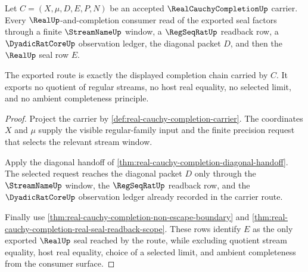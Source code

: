 \begin{theorem}
\label{thm:real-cauchy-completion-stream-regseq-tail-seal-factorization}
Let $C=(X,\mu,D,E,P,N)$ be an accepted $\RealCauchyCompletionUp$ carrier. Every $\RealUp$-and-completion consumer read of the exported seal factors through a finite $\StreamNameUp$ window, a $\RegSeqRatUp$ readback row, a $\DyadicRatCoreUp$ observation ledger, the diagonal packet $D$, and then the $\RealUp$ seal row $E$.

The exported route is exactly the displayed completion chain carried by $C$. It exports no quotient of regular streams, no host real equality, no selected limit, and no ambient completeness principle.
\end{theorem}
\begin{proof}
Project the carrier by \autoref{def:real-cauchy-completion-carrier}. The coordinates $X$ and $\mu$ supply the visible regular-family input and the finite precision request that selects the relevant stream window.

Apply the diagonal handoff of \autoref{thm:real-cauchy-completion-diagonal-handoff}. The selected request reaches the diagonal packet $D$ only through the $\StreamNameUp$ window, the $\RegSeqRatUp$ readback row, and the $\DyadicRatCoreUp$ observation ledger already recorded in the carrier route.

Finally use \autoref{thm:real-cauchy-completion-non-escape-boundary} and \autoref{thm:real-cauchy-completion-real-seal-readback-scope}. These rows identify $E$ as the only exported $\RealUp$ seal reached by the route, while excluding quotient stream equality, host real equality, choice of a selected limit, and ambient completeness from the consumer surface.
\end{proof}

